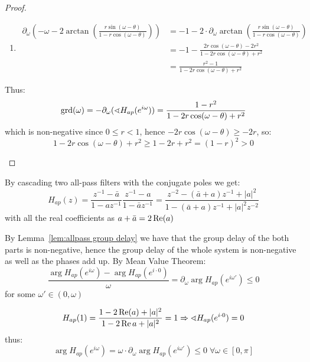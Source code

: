 \begin{proof}
\begin{enumerate}
\begin{enumerate}[label = Step \arabic*., align = left]
\begin{align*}
                        \end{align*}
                  \item
                        \begin{align*}
                            \partial_{\omega} \left( -\omega - 2\arctan \left(\frac{r \sin(\omega - \theta)}{1 - r \cos (\omega - \theta)}\right) \right)
                             & = -1 - 2 \cdot \partial_{\omega} \arctan \left(\frac{r \sin(\omega - \theta)}{1 - r \cos (\omega - \theta)}\right)
                            \\ &=-1 - \frac{2r \cos(\omega - \theta) - 2r^2}{1 - 2r \cos (\omega - \theta) + r^2}
                            \\ &=\frac{r^2 - 1}{1 - 2r \cos (\omega - \theta) + r^2}
                        \end{align*}
              \end{enumerate}

              Thus:
              \[\operatorname{grd}(\omega)
                  = - \partial_\omega{(\sphericalangle{H_{ap}(e^{i\omega})})}
                  = \frac{1 - r^2}{1 - 2r \cos (\omega - \theta) + r^2}\]
              which is non-negative since $0 \leq r < 1$, hence $-2r \cos(\omega - \theta) \geq -2r$, so:
              \[1 - 2r \cos (\omega - \theta) + r^2
                  \geq 1 - 2r + r^2
                  = (1 - r)^2 > 0\]
    \end{enumerate}
\end{proof}

By cascading two all-pass filters with the conjugate poles we get:
\[H_{ap}(z)
    = \frac{z^{-1} - \bar{a}}{1 - az^{-1}} \frac{z^{-1} - a}{1 - \bar{a}z^{-1}}
    =  \frac{z^{-2} - (\bar{a} + a) z^{-1} + |a|^2}{1 - (\bar{a} + a) z^{-1} + |a|^2 z^{-2}}\]
with all the real coefficients as $a + \bar{a} = 2\operatorname{Re}(a)$

By Lemma~\ref{lem:allpass group delay} we have that the group delay of the both parts is non-negative, hence the group delay of the whole system is non-negative as well as the phases add up. By Mean Value Theorem:
\[\frac{\arg H_{ap}(e^{i\omega}) - \arg H_{ap}(e^{i \cdot 0})}{\omega}
    = \partial_{\omega} \arg H_{ap}(e^{i\omega'}) \leq 0\]
for some $\omega' \in (0, \omega)$

\[H_{ap}(1) =
    \frac{1 - 2 \operatorname{Re}(a) + |a|^2}{1 - 2\operatorname{Re}{a} + |a|^2}
    = 1 \Rightarrow \sphericalangle H_{ap}(e^{i \cdot 0}) = 0\]
thus:
\[\arg H_{ap}(e^{i\omega}) = \omega \cdot \partial_{\omega} \arg H_{ap}(e^{i\omega'}) \leq 0 \; \forall \omega \in [0, \pi]\]

